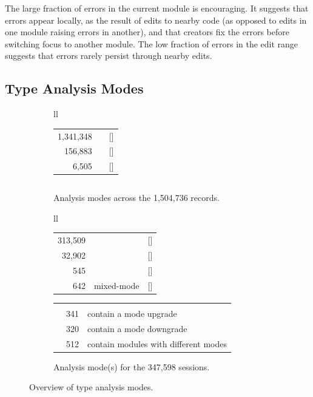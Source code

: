 \documentclass[english,submission,cleveref]{programming}
\begin{document}
The large fraction of errors in the current module is encouraging.
It suggests that errors appear locally, as the result of edits to nearby
code (as opposed to edits in one module raising errors in another), and
that creators fix the errors before switching focus to another
module.
The low fraction of errors in the edit range suggests that errors rarely
persist through nearby edits.


\subsection{Type Analysis Modes}
\label{s:type-analysis-modes}

\begin{figure}[t]\centering
  \begin{subfigure}[t]{\columnwidth}
    \begin{tabular}[t]{ll}
      \begin{tabular}[t]{r@{~~}l@{~}r}
         1,341,348 & \mnocheck{}          & [\pct{89.14}] \\
           156,883 & \mnonstrict{}        & [\pct{10.43}] \\
             6,505 & \mstrict{}           & [\pct{ 0.43}]
      \end{tabular}
      \begin{tabular}[t]{r@{~~}l@{~~}r}
      \end{tabular}
    \end{tabular}
    \caption{Analysis modes across the 1,504,736 records.}
    \label{f:total-records}
  \end{subfigure}

  \begin{subfigure}[t]{\columnwidth}
    \begin{tabular}[t]{ll} \\
      \begin{tabular}[t]{r@{~~}r@{~}r}
        313,509 & \mnocheck{}   & [\pct{90.19}] \\
         32,902 & \mnonstrict{} & [\pct{ 9.47}] \\
            545 & \mstrict{}    & [\pct{ 0.16}] \\
            642 & mixed-mode    & [\pct{ 0.18}]
      \end{tabular}
      \begin{tabular}[t]{l@{~~}ll}
        \zerowidth{Among the mixed-mode sessions:} \\
        & 341 & contain a mode upgrade \\
        & 320 & contain a mode downgrade \\
        & 512 & contain modules with different modes
      \end{tabular}
    \end{tabular}
    \caption{Analysis mode(s) for the 347,598 sessions.}
    \label{f:total-sessions}
  \end{subfigure}

  \caption{Overview of type analysis modes.}
  \label{f:dataset-overview}
\end{figure}
\end{document}

